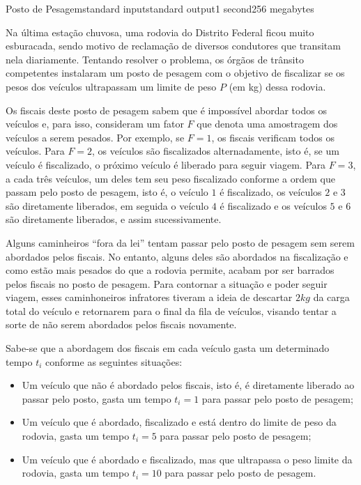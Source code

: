 \begin{problem}{Posto de Pesagem}{standard input}{standard output}{1 second}{256 megabytes}

Na última estação chuvosa, uma rodovia do Distrito Federal ficou muito esburacada, sendo motivo de reclamação de diversos condutores que transitam nela diariamente. Tentando resolver o problema, os órgãos de trânsito competentes instalaram um posto de pesagem com o objetivo de fiscalizar se os pesos dos veículos ultrapassam um limite de peso $P$ (em kg) dessa rodovia.

Os fiscais deste posto de pesagem sabem que é impossível abordar todos os veículos e, para isso, consideram um fator $F$ que denota uma amostragem dos veículos a serem pesados. Por exemplo, se $F=1$, os fiscais verificam todos os veículos. Para $F=2$, os veículos são fiscalizados alternadamente, isto é, se um veículo é fiscalizado, o próximo veículo é liberado para seguir viagem. Para $F=3$, a cada três veículos, um deles tem seu peso fiscalizado conforme a ordem que passam pelo posto de pesagem, isto é, o veículo $1$ é fiscalizado, os veículos $2$ e $3$ são diretamente liberados, em seguida o veículo $4$ é fiscalizado e os veículos $5$ e $6$ são diretamente liberados, e assim sucessivamente.

Alguns caminheiros ``fora da lei'' tentam passar pelo posto de pesagem sem serem abordados pelos fiscais. No entanto, alguns deles são abordados na fiscalização e como estão mais pesados do que a rodovia permite, acabam por ser barrados pelos fiscais no posto de pesagem. Para contornar a situação e poder seguir viagem, esses caminhoneiros infratores tiveram a ideia de descartar $2kg$ da carga total do veículo e retornarem para o final da fila de veículos, visando tentar a sorte de não serem abordados pelos fiscais novamente.

Sabe-se que a abordagem dos fiscais em cada veículo gasta um determinado tempo $t_i$ conforme as seguintes situações:

\begin{itemize}
\item Um veículo que não é abordado pelos fiscais, isto é, é diretamente liberado ao passar pelo posto, gasta um tempo $t_i=1$ para passar pelo posto de pesagem;
\item Um veículo que é abordado, fiscalizado e está dentro do limite de peso da rodovia, gasta um tempo $t_i=5$ para passar pelo posto de pesagem;
\item Um veículo que é abordado e fiscalizado, mas que ultrapassa o peso limite da rodovia, gasta um tempo $t_i=10$ para passar pelo posto de pesagem.
\end{itemize}


\end{problem}
